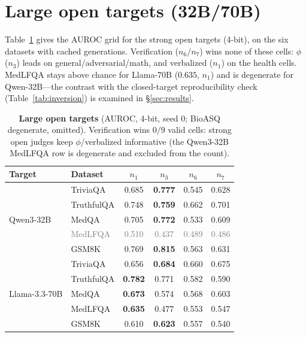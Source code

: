 \documentclass[11pt]{article}
\newcommand{\grey}[1]{\textcolor{gray}{#1}}
\newcommand{\nverb}{$n_1$}     %
\newcommand{\nphi}{$n_3$}      %
\newcommand{\nyn}{$n_6$}       %
\newcommand{\nsc}{$n_7$}       %
\begin{document}
\section{Large open targets (32B/70B)}\label{app:bigopen}
Table~\ref{tab:bigopen} gives the AUROC grid for the strong open targets (4-bit), on the six
datasets with cached generations. Verification ($n_6/n_7$) wins none of these cells: $\phi$
($n_3$) leads on general/adversarial/math, and verbalized ($n_1$) on the health cells. MedLFQA
stays above chance for Llama-70B ($0.635$, $n_1$) and is degenerate for Qwen-32B---the contrast
with the closed-target reproducibility check (Table~\ref{tab:inversion}) is examined in
\S\ref{sec:results}.
\begin{table}[t]
\centering\small
\begin{tabular}{llcccc}
\toprule
Target & Dataset & \nverb & \nphi & \nyn & \nsc \\
\midrule
\multirow{5}{*}{Qwen3-32B}
 & TriviaQA   & 0.685 & \textbf{0.777} & 0.545 & 0.628 \\
 & TruthfulQA & 0.748 & \textbf{0.759} & 0.662 & 0.701 \\
 & MedQA      & 0.705 & \textbf{0.772} & 0.533 & 0.609 \\
 & \grey{MedLFQA} & \grey{0.510} & \grey{0.437} & \grey{0.489} & \grey{0.486} \\
 & GSM8K      & 0.769 & \textbf{0.815} & 0.563 & 0.631 \\
\midrule
\multirow{5}{*}{Llama-3.3-70B}
 & TriviaQA   & 0.656 & \textbf{0.684} & 0.660 & 0.675 \\
 & TruthfulQA & \textbf{0.782} & 0.771 & 0.582 & 0.590 \\
 & MedQA      & \textbf{0.673} & 0.574 & 0.568 & 0.603 \\
 & MedLFQA    & \textbf{0.635} & 0.477 & 0.553 & 0.547 \\
 & GSM8K      & 0.610 & \textbf{0.623} & 0.557 & 0.540 \\
\bottomrule
\end{tabular}
\caption{\textbf{Large open targets} (AUROC, 4-bit, seed 0; BioASQ degenerate, omitted).
Verification wins $0/9$ valid cells: strong open judges keep $\phi$/verbalized informative
(the Qwen3-32B MedLFQA row is degenerate and excluded from the count).}
\label{tab:bigopen}
\end{table}
\end{document}
